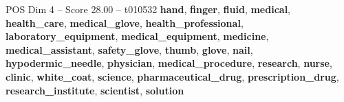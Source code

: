 \begin{textsample}{POS Dim 4 – Score 28.00 – t010532}  \label{ex:f4_pos_029}
\textbf{hand}, \textbf{finger}, \textbf{fluid}, \textbf{medical}, \textbf{health\_care}, \textbf{medical\_glove}, \textbf{health\_professional}, \textbf{laboratory\_equipment}, \textbf{medical\_equipment}, \textbf{medicine}, \textbf{medical\_assistant}, \textbf{safety\_glove}, \textbf{thumb}, \textbf{glove}, \textbf{nail}, \textbf{hypodermic\_needle}, \textbf{physician}, \textbf{medical\_procedure}, \textbf{research}, \textbf{nurse}, \textbf{clinic}, \textbf{white\_coat}, \textbf{science}, \textbf{pharmaceutical\_drug}, \textbf{prescription\_drug}, \textbf{research\_institute}, \textbf{scientist}, \textbf{solution}

\end{textsample}
